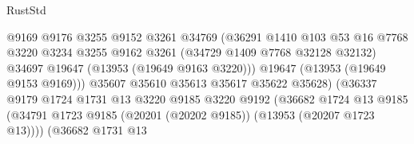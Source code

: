 \begin{lexlean}{RustStd}
\begin{coremodule}
                                            @9169
                                            @9176
                                            @3255
                                            @9152
                                            @3261
                                            @34769
                                            (@36291
                                              @1410
                                              @103
                                              @53
                                              @16
                                              @7768
                                              @3220
                                              @3234
                                              @3255
                                              @9162
                                              @3261
                                              (@34729 @1409 @7768 @32128 @32132)
                                              @34697
                                              @19647
                                              (@13953 (@19649 @9163 @3220)))
                                            @19647
                                            (@13953 (@19649 @9153 @9169)))
                                          @35607
                                          @35610
                                          @35613
                                          @35617
                                          @35622
                                          @35628)
                                        (@36337
                                          @9179
                                          @1724
                                          @1731
                                          @13
                                          @3220
                                          @9185
                                          @3220
                                          @9192
                                          (@36682
                                            @1724
                                            @13
                                            @9185
                                            (@34791
                                              @1723
                                              @9185
                                              (@20201 (@20202 @9185))
                                              (@13953 (@20207 @1723 @13))))
                                          (@36682
                                            @1731
                                            @13

\end{coremodule}
\end{lexlean}
